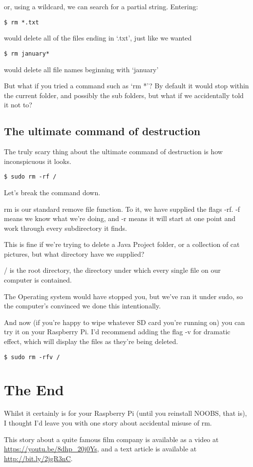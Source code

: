 		or, using a wildcard, we can search for a partial string. Entering:
\begin{lstlisting}
$ rm *.txt
\end{lstlisting}

		would delete all of the files ending in `.txt', just like we wanted
\begin{lstlisting}
$ rm january*
\end{lstlisting}

		would delete all file names beginning with `january'
	
		But what if you tried a command such as `rm *'? By default it would stop within the current folder, and possibly the sub folders, but what if we accidentally told it not to?
	
	\subsection{The ultimate command of destruction}
	
	The truly scary thing about the ultimate command of destruction is how inconspicuous it looks.
	
\begin{lstlisting}
$ sudo rm -rf /
\end{lstlisting}

	Let's break the command down.
	
	rm is our standard remove file function. To it, we have supplied the flags -rf. -f means we know what we're doing, and -r means it will start at one point and work through every subdirectory it finds.
	
	This is fine if we're trying to delete a Java Project folder, or a collection of cat pictures, but what directory have we supplied?
	
	/ is the root directory, the directory under which every single file on our computer is contained.
	
	The Operating system would have stopped you, but we've ran it under sudo, so the computer's convinced we done this intentionally.
	
	And now (if you're happy to wipe whatever SD card you're running on) you can try it on your Raspberry Pi. I'd recommend adding the flag -v for dramatic effect, which will display the files as they're being deleted.
	
\begin{lstlisting}
$ sudo rm -rfv /
\end{lstlisting}

\section{The End}

	Whilst it certainly is for your Raspberry Pi (until you reinstall NOOBS, that is), I thought I'd leave you with one story about accidental misuse of rm.
	
	This story about a quite famous film company is available as a video at \url{https://youtu.be/8dhp_20j0Ys}, and a text article is available at \url{http://bit.ly/2jgR3nC}.